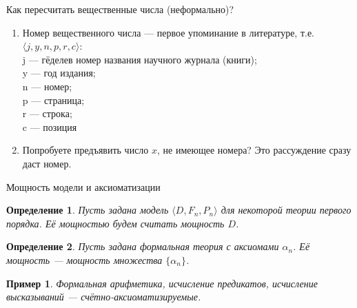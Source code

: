 \documentclass[aspectratio=169]{beamer}
\newtheorem{dfn}{Определение}[section]
\newtheorem{exm}{Пример}[section]
\begin{document}


\begin{frame}{Как пересчитать вещественные числа (неформально)?}
\begin{enumerate}
\item Номер вещественного числа --- первое упоминание в литературе, т.е. $\langle j, y, n, p, r, c \rangle$:\\
j --- гёделев номер названия научного журнала (книги);\\
y --- год издания;\\
n --- номер;\\
p --- страница;\\
r --- строка;\\
c --- позиция\pause
\item Попробуете предъявить число $x$, не имеющее номера? Это рассуждение сразу даст номер.\\
\end{enumerate}
\end{frame}

\begin{frame}{Мощность модели и аксиоматизации}
\begin{dfn} Пусть задана модель $\langle D, F_n, P_n \rangle$ для некоторой теории первого порядка. 
Её мощностью будем считать мощность $D$.
\end{dfn}\pause

\begin{dfn} Пусть задана формальная теория с аксиомами $\alpha_n$. Её мощность --- мощность множества $\{\alpha_n\}$.
\end{dfn}\pause

\begin{exm} Формальная арифметика, исчисление предикатов, исчисление высказываний --- счётно-аксиоматизируемые.
\end{exm}
\end{frame}
\end{document}
